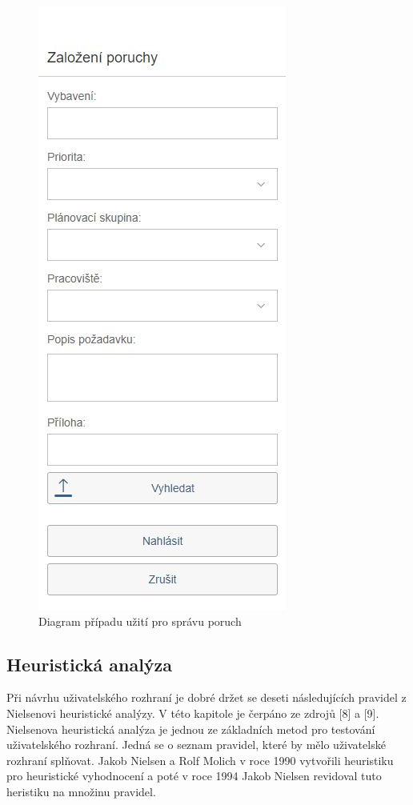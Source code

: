 \documentclass[thesis=M,czech]{FITthesis}[2012/06/26]
\begin{document}
\begin{figure}[H]
	\centering
	\includegraphics[]{images/bu_zalozeni_poruchy_mob}
	\caption{Diagram případu užití pro správu poruch}
	\label{img:uc_sprava_poruch}
\end{figure}

\subsection{Heuristická analýza}
Při návrhu uživatelského rozhraní je dobré držet se deseti následujících pravidel z Nielsenovi heuristické analýzy. V této kapitole je čerpáno ze zdrojů [8] a [9]. Nielsenova heuristická analýza je jednou ze základních metod pro testování uživatelského rozhraní. Jedná se o seznam pravidel, které by mělo uživatelské rozhraní splňovat. Jakob Nielsen a Rolf Molich v roce 1990 vytvořili heuristiku
pro heuristické vyhodnocení a poté v roce 1994 Jakob Nielsen revidoval tuto heristiku na množinu pravidel.
\end{document}
